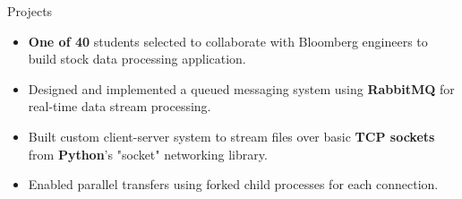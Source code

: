 \documentclass{resume} %
\begin{document}
\begin{workSection}{Projects}
	\customItem[
		title=Bloomberg Tech Lab on Campus,
		duration=Team of 2 | April 2024,
	]
	\begin{itemize}
		\vspace{-0.5em}
		\itemsep -6pt {}
		\item \textbf{One of 40} students selected to collaborate with Bloomberg engineers 
		to build stock data processing application. %
		\item Designed and implemented a queued messaging system using \textbf{RabbitMQ} for real-time data stream processing.
	\end{itemize}
	
	
	\customItem[
		title=\href{https://github.com/AshkanArabim/os-file-transfer}{TCP/IP file-transfer \faExternalLink},
		duration=Solo | March 2024,
	]
	\begin{itemize}
		\vspace{-0.5em}
		\itemsep -6pt {}
		\item Built custom client-server system to stream files over basic \textbf{TCP sockets} from \textbf{Python}'s "socket" networking library.
		\item Enabled parallel transfers using forked child processes for each connection.
	\end{itemize}
	

\end{workSection}
\end{document}
